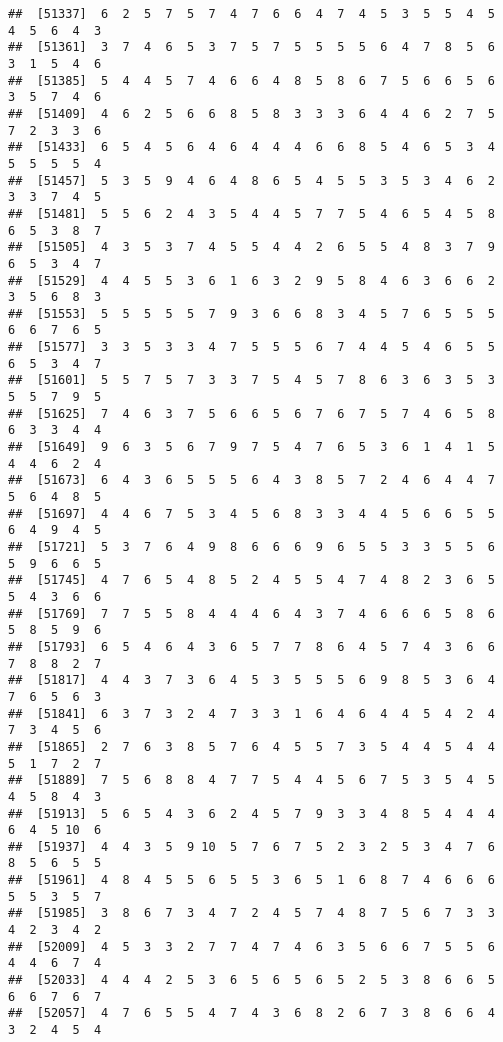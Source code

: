 \documentclass[
]{book}
\begin{document}
\begin{verbatim}
##  [51337]  6  2  5  7  5  7  4  7  6  6  4  7  4  5  3  5  5  4  5  4  5  6  4  3
##  [51361]  3  7  4  6  5  3  7  5  7  5  5  5  5  6  4  7  8  5  6  3  1  5  4  6
##  [51385]  5  4  4  5  7  4  6  6  4  8  5  8  6  7  5  6  6  5  6  3  5  7  4  6
##  [51409]  4  6  2  5  6  6  8  5  8  3  3  3  6  4  4  6  2  7  5  7  2  3  3  6
##  [51433]  6  5  4  5  6  4  6  4  4  4  6  6  8  5  4  6  5  3  4  5  5  5  5  4
##  [51457]  5  3  5  9  4  6  4  8  6  5  4  5  5  3  5  3  4  6  2  3  3  7  4  5
##  [51481]  5  5  6  2  4  3  5  4  4  5  7  7  5  4  6  5  4  5  8  6  5  3  8  7
##  [51505]  4  3  5  3  7  4  5  5  4  4  2  6  5  5  4  8  3  7  9  6  5  3  4  7
##  [51529]  4  4  5  5  3  6  1  6  3  2  9  5  8  4  6  3  6  6  2  3  5  6  8  3
##  [51553]  5  5  5  5  5  7  9  3  6  6  8  3  4  5  7  6  5  5  5  6  6  7  6  5
##  [51577]  3  3  5  3  3  4  7  5  5  5  6  7  4  4  5  4  6  5  5  6  5  3  4  7
##  [51601]  5  5  7  5  7  3  3  7  5  4  5  7  8  6  3  6  3  5  3  5  5  7  9  5
##  [51625]  7  4  6  3  7  5  6  6  5  6  7  6  7  5  7  4  6  5  8  6  3  3  4  4
##  [51649]  9  6  3  5  6  7  9  7  5  4  7  6  5  3  6  1  4  1  5  4  4  6  2  4
##  [51673]  6  4  3  6  5  5  5  6  4  3  8  5  7  2  4  6  4  4  7  5  6  4  8  5
##  [51697]  4  4  6  7  5  3  4  5  6  8  3  3  4  4  5  6  6  5  5  6  4  9  4  5
##  [51721]  5  3  7  6  4  9  8  6  6  6  9  6  5  5  3  3  5  5  6  5  9  6  6  5
##  [51745]  4  7  6  5  4  8  5  2  4  5  5  4  7  4  8  2  3  6  5  5  4  3  6  6
##  [51769]  7  7  5  5  8  4  4  4  6  4  3  7  4  6  6  6  5  8  6  5  8  5  9  6
##  [51793]  6  5  4  6  4  3  6  5  7  7  8  6  4  5  7  4  3  6  6  7  8  8  2  7
##  [51817]  4  4  3  7  3  6  4  5  3  5  5  5  6  9  8  5  3  6  4  7  6  5  6  3
##  [51841]  6  3  7  3  2  4  7  3  3  1  6  4  6  4  4  5  4  2  4  7  3  4  5  6
##  [51865]  2  7  6  3  8  5  7  6  4  5  5  7  3  5  4  4  5  4  4  5  1  7  2  7
##  [51889]  7  5  6  8  8  4  7  7  5  4  4  5  6  7  5  3  5  4  5  4  5  8  4  3
##  [51913]  5  6  5  4  3  6  2  4  5  7  9  3  3  4  8  5  4  4  4  6  4  5 10  6
##  [51937]  4  4  3  5  9 10  5  7  6  7  5  2  3  2  5  3  4  7  6  8  5  6  5  5
##  [51961]  4  8  4  5  5  6  5  5  3  6  5  1  6  8  7  4  6  6  6  5  5  3  5  7
##  [51985]  3  8  6  7  3  4  7  2  4  5  7  4  8  7  5  6  7  3  3  4  2  3  4  2
##  [52009]  4  5  3  3  2  7  7  4  7  4  6  3  5  6  6  7  5  5  6  4  4  6  7  4
##  [52033]  4  4  4  2  5  3  6  5  6  5  6  5  2  5  3  8  6  6  5  6  6  7  6  7
##  [52057]  4  7  6  5  5  4  7  4  3  6  8  2  6  7  3  8  6  6  4  3  2  4  5  4

\end{verbatim}
\end{document}
